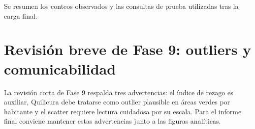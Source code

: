 Se resumen los conteos observados y las consultas de prueba utilizadas tras la carga final.





\chapter{Revisión breve de Fase 9: outliers y comunicabilidad}

La revisión corta de Fase 9 respalda tres advertencias: el índice de rezago es auxiliar, Quilicura debe tratarse como outlier plausible en áreas verdes por habitante y el scatter requiere lectura cuidadosa por su escala. Para el informe final conviene mantener estas advertencias junto a las figuras analíticas.


